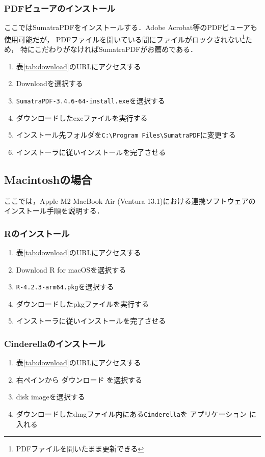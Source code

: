 \subsubsection{PDFビューアのインストール}
ここではSumatraPDFをインストールする．Adobe Acrobat等のPDFビューアも使用可能だが，
PDFファイルを開いている間にファイルがロックされない\footnote{PDFファイルを開いたまま更新できる}ため，
特にこだわりがなければSumatraPDFがお薦めである．
\begin{enumerate}
    \item 表\ref{tab:download}のURLにアクセスする
    \item Downloadを選択する
    \item \verb|SumatraPDF-3.4.6-64-install.exe|を選択する
    \item ダウンロードしたexeファイルを実行する
    \item インストール先フォルダを\verb|C:\Program Files\SumatraPDF|に変更する
    \item インストーラに従いインストールを完了させる
\end{enumerate}

\subsection{Macintoshの場合}

ここでは，Apple M2 MacBook Air (Ventura 13.1)における連携ソフトウェアのインストール手順を説明する．

\subsubsection{Rのインストール}
\begin{enumerate}
    \item 表\ref{tab:download}のURLにアクセスする
    \item Download R for macOSを選択する
    \item \verb|R-4.2.3-arm64.pkg|を選択する
    \item ダウンロードしたpkgファイルを実行する
    \item インストーラに従いインストールを完了させる
\end{enumerate}

\subsubsection{Cinderellaのインストール}
\begin{enumerate}
    \item 表\ref{tab:download}のURLにアクセスする
    \item 右ペインから ダウンロード を選択する
    \item disk imageを選択する
    \item ダウンロードしたdmgファイル内にある\verb|Cinderella|を アプリケーション に入れる
\end{enumerate}

